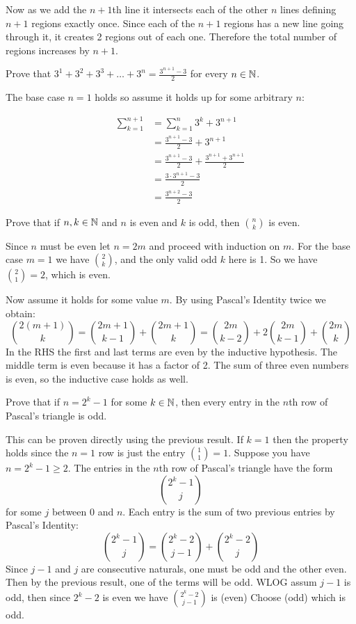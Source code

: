 \documentclass{article}
\begin{document}
Now as we add the $n+1$th line it intersects each of the other $n$ lines defining $n+1$ regions exactly once. Since each of the $n+1$ regions has a new line going through it, it creates 2 regions out of each one. Therefore the total number of regions increases by $n+1$.

\begin{problem}
Prove that $3^1 + 3^2 + 3^3 + \ldots + 3^n = \frac{3^{n+1} - 3}{2}$ for every $n \in \mathbb{N}$.
\end{problem}

The base case $n = 1$ holds so assume it holds up for some arbitrary $n$:

\begin{align*}
    \sum_{k=1}^{n+1} & = \sum_{k=1}^n 3^k + 3^{n+1}                          \\
                     & = \frac{3^{n+1} - 3}{2} + 3^{n+1}                     \\
                     & = \frac{3^{n+1} - 3}{2} + \frac{3^{n+1} + 3^{n+1}}{2} \\
                     & = \frac{3\cdot 3^{n+1} - 3}{2}                        \\
                     & = \frac{3^{n+2} - 3}{2}
\end{align*}

\begin{problem}
Prove that if $n, k \in \mathbb{N}$ and $n$ is even and $k$ is odd, then $\binom{n}{k}$ is even.
\end{problem}

Since $n$ must be even let $n = 2m$ and proceed with induction on $m$. For the base case $m = 1$ we have $\binom{2}{k}$, and the only valid odd $k$ here is 1. So we have $\binom{2}{1} = 2$, which is even.

Now assume it holds for some value $m$. By using Pascal's Identity twice we obtain:
$$\binom{2(m+1)}{k} = \binom{2m + 1}{k-1} + \binom{2m+1}{k} = \binom{2m}{k-2} + 2\binom{2m}{k-1} + \binom{2m}{k}$$
In the RHS the first and last terms are even by the inductive hypothesis. The middle term is even because it has a factor of 2. The sum of three even numbers is even, so the inductive case holds as well.

\begin{problem}
Prove that if $n = 2^k - 1$ for some $k \in \mathbb{N}$, then every entry in the $n$th row of Pascal's triangle is odd.
\end{problem}

This can be proven directly using the previous result. If $k = 1$ then the property holds since the $n = 1$ row is just the entry $\binom{1}{1} = 1$. Suppose you have $n = 2^k -1 \geq 2$. The entries in the $n$th row of Pascal's triangle have the form
$$\binom{2^k - 1}{j}$$
for some $j$ between 0 and $n$. Each entry is the sum of two previous entries by Pascal's Identity:
$$\binom{2^k - 1}{j} = \binom{2^k - 2}{j-1} + \binom{2^k - 2}{j}$$
Since $j-1$ and $j$ are consecutive naturals, one must be odd and the other even. Then by the previous result, one of the terms will be odd. WLOG assum $j-1$ is odd, then since $2^k - 2$ is even we have $\binom{2^k - 2}{j-1}$ is (even) Choose (odd) which is odd.
\end{document}
